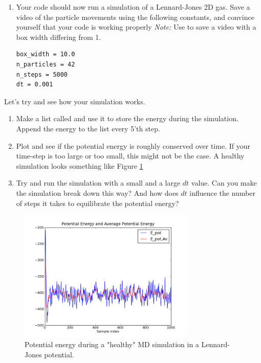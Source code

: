 \documentclass{article}
\begin{document}
\begin{enumerate}[resume]
    \item Your code should now run a simulation of a Lennard-Jones 2D gas.
        Save a video of the particle movements using the following constants, and convince yourself that your code is working properly
        {\em Note:} Use  to save a video with a box width differing from 1.

\begin{lstlisting}
box_width = 10.0
n_particles = 42
n_steps = 5000
dt = 0.001
\end{lstlisting}

\end{enumerate}



Let's try and see how your simulation works.

\begin{enumerate}[resume]

    \item Make a list called  and use it to store the energy during the simulation.
        Append the energy to the list every 5'th step.

    \item Plot  and see if the potential energy is roughly conserved over time.
        If your time-step is too large or too small, this might not be the case.
        A healthy simulation looks something like Figure \ref{fig:potential_energy}

    \item Try and run the simulation with a small and a large $dt$ value. 
        Can you make the simulation break down this way?
        And how does $dt$ influence the number of steps it takes to equilibrate the potential energy?

\end{enumerate}

\begin{figure}[htb]
  \centering
  \includegraphics[width=0.75\textwidth]{potential_energy.png}
  \caption{Potential energy during a "healthy" MD simulation in a Lennard-Jones potential.}
  \label{fig:potential_energy}
\end{figure}
\end{document}
